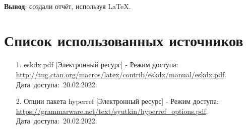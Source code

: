 \documentclass[12pt, a4paper, simple]{eskdtext}
\begin{document}
    \paragraph{} \textbf{Вывод}: создали отчёт, используя \LaTeX.

    \section*{Список использованных источников}
    \begin{enumerate}
        \item[1.] eskdx.pdf [Электронный ресурс]
        - Режим доступа: \url{http://tug.ctan.org/macros/latex/contrib/eskdx/manual/eskdx.pdf}.
        Дата~доступа:~20.02.2022.
        \item[2.] Опции пакета hyperref [Электронный ресурс]
        - Режим доступа: \url{https://grammarware.net/text/syutkin/hyperref_options.pdf}.
        Дата~доступа:~20.02.2022.
    \end{enumerate}
    \newpage
\end{document}
